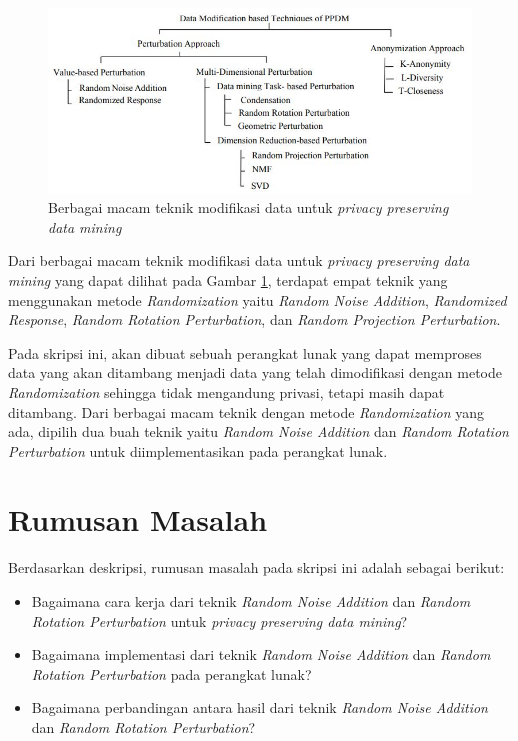 \documentclass[a4paper,twoside]{article}
\begin{document}
\begin{figure}
	\centering
	\includegraphics[scale=0.785]{ppdm}
	\caption{Berbagai macam teknik modifikasi data untuk \textit{privacy preserving data mining}}
	\label{fig:ppdm}
\end{figure}

Dari berbagai macam teknik modifikasi data untuk \textit{privacy preserving data mining} yang dapat dilihat pada Gambar \ref{fig:ppdm}, terdapat empat teknik yang menggunakan metode \textit{Randomization} yaitu \textit{Random Noise Addition}, \textit{Randomized Response}, \textit{Random Rotation Perturbation}, dan \textit{Random Projection Perturbation}.

Pada skripsi ini, akan dibuat sebuah perangkat lunak yang dapat memproses data yang akan ditambang menjadi data yang telah dimodifikasi dengan metode \textit{Randomization} sehingga tidak mengandung privasi, tetapi masih dapat ditambang. Dari berbagai macam teknik dengan metode \textit{Randomization} yang ada, dipilih dua buah teknik yaitu \textit{Random Noise Addition} dan \textit{Random Rotation Perturbation} untuk diimplementasikan pada perangkat lunak.

\section{Rumusan Masalah}
Berdasarkan deskripsi, rumusan masalah pada skripsi ini adalah sebagai berikut:
\begin{itemize}
	\item Bagaimana cara kerja dari teknik \textit{Random Noise Addition} dan \textit{Random Rotation Perturbation} untuk \textit{privacy preserving data mining}?
	\item Bagaimana implementasi dari teknik \textit{Random Noise Addition} dan \textit{Random Rotation Perturbation} pada perangkat lunak?
	\item Bagaimana perbandingan antara hasil dari teknik \textit{Random Noise Addition} dan \textit{Random Rotation Perturbation}?
\end{itemize}
\end{document}
